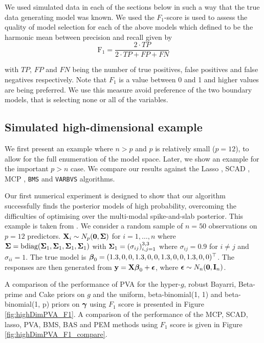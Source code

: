 We used simulated data in each of the sections below in such a way that the true data generating model was known. We used the 
$F_1$-score \citep[see][]{Van_Rijsbergen1979}
is used to assess the quality of model selection
for each of the above models which
defined to be the harmonic mean between precision and recall given by
$$
\mbox{F}_1 = \frac{2\cdot TP}{2\cdot TP + FP + FN}
$$

\noindent
with $TP$, $FP$ and $FN$ being the number of true positives, false
positives and false negatives respectively. Note that $F_1$ is a value between
0 and 1 and higher values are being preferred. We use this measure 
avoid preference of the two boundary models, that is selecting none or all
of the variables. 

\subsection{Simulated high-dimensional example}
\label{sec:highdimensional} 

We first present an example where $n > p$ and $p$ is relatively small ($p = 12$), to allow for the full
enumeration of the model space. Later, we show an example for the important $p > n$ case. We compare our
results  against the Lasso \citep{Tibshirani1996}, SCAD \citep{Fan2001}, MCP \citep{Zhang2010}, {\tt BMS}
\citep{Zeugner2015} and {\tt VARBVS} \citep{Carbonetto2011} algorithms.

Our first numerical experiment is designed to show that our algorithm successfully finds the posterior models
of high probability, overcoming the difficulties of optimising over the multi-modal spike-and-slab posterior.
This example is taken from \citep{Rockova2017}. 
We consider a random sample of $n = 50$ observations on $p = 12$ predictors. ${\bf X}_i \sim N_p({\bf 0}, {\boldsymbol \Sigma})$
for $i = 1, \ldots, n$ where
${\boldsymbol \Sigma} = \text{bdiag}({\boldsymbol \Sigma}_1, {\boldsymbol \Sigma}_1, {\boldsymbol \Sigma}_1, {\boldsymbol \Sigma}_1)$ with
${\boldsymbol \Sigma}_1 = (\sigma_{ij})_{i, j = 1}^{3, 3}$ where $\sigma_{ij} = 0.9$ for $i \ne j$ and $\sigma_{ii} = 1$.
The true model is ${\boldsymbol \beta}_0 = (1.3, 0, 0, 1.3, 0, 0, 1.3, 0, 0, 1.3, 0, 0)^\top$.
The responses are then generated from ${\bf y} = {\bf X} {\boldsymbol \beta}_0 + {\boldsymbol \epsilon}$, where
${\boldsymbol \epsilon} \sim N_n({\bf 0}, {\bf I}_n)$.

A comparison of the performance of PVA for the hyper-$g$, robust Bayarri, Beta-prime and Cake priors on $g$
and the uniform, beta-binomial(1, 1) and beta-binomial(1, p) priors on ${\boldsymbol \gamma}$ using $F_1$ score is
presented in Figure \ref{fig:highDimPVA_F1}. A comparison of the performance of the MCP, SCAD, lasso, PVA, BMS,
BAS and PEM  methods using $F_1$ score is given in Figure \ref{fig:highDimPVA_F1_compare}.

